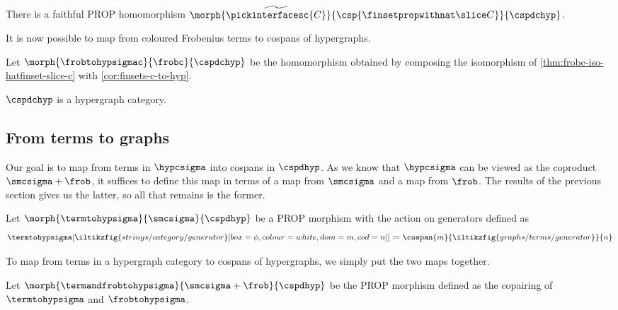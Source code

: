 \begin{corollary}\label{cor:finsets-c-to-hyp}
    There is a faithful PROP homomorphism \(
    \morph{
        \widetilde{\pickinterfacesc{C}}
    }{
        \csp{\finsetpropwithnat \slice C}
    }{
        \cspdchyp
    }
    \).
\end{corollary}

It is now possible to map from coloured Frobenius terms to cospans of
hypergraphs.

\begin{definition}
    Let \(\morph{\frobtohypsigmac}{\frobc}{\cspdchyp}\) be the homomorphism
    obtained by composing the isomorphism of \cref{thm:frobc-iso-hatfinset-slice-c}
    with \cref{cor:finsets-c-to-hyp}.
\end{definition}

\begin{corollary}
    \(\cspdchyp\) is a hypergraph category.
\end{corollary}

\subsection{From terms to graphs}

Our goal is to map from terms in \(\hypcsigma\) into cospans in \(\cspdhyp\).
As we know that \(\hypcsigma\) can be viewed as the coproduct
\(\smcsigma + \frob\), it suffices to define this map in terms of a map from
\(\smcsigma\) and a map from \(\frob\).
The results of the previous section gives us the latter, so all that remains is
the former.

\begin{definition}\label{def:hyp-morphisms}
    Let \(\morph{\termtohypsigma}{\smcsigma}{\cspdhyp}\) be a PROP
    morphism with the action on generators defined as \[
        \termtohypsigma[\iltikzfig{%
                strings/category/generator%
            }[box=\phi,colour=white,dom=m,cod=n]
        ]
        \coloneqq
        \cospan{m}{\iltikzfig{graphs/terms/generator}}{n}
    \]
\end{definition}

To map from terms in a hypergraph category to cospans of hypergraphs, we simply
put the two maps together.

\begin{definition}
    Let \(
    \morph{\termandfrobtohypsigma}{\smcsigma + \frob}{\cspdhyp}
    \) be the PROP morphism defined as the copairing of \(\termtohypsigma\) and
    \(\frobtohypsigma\).
\end{definition}

